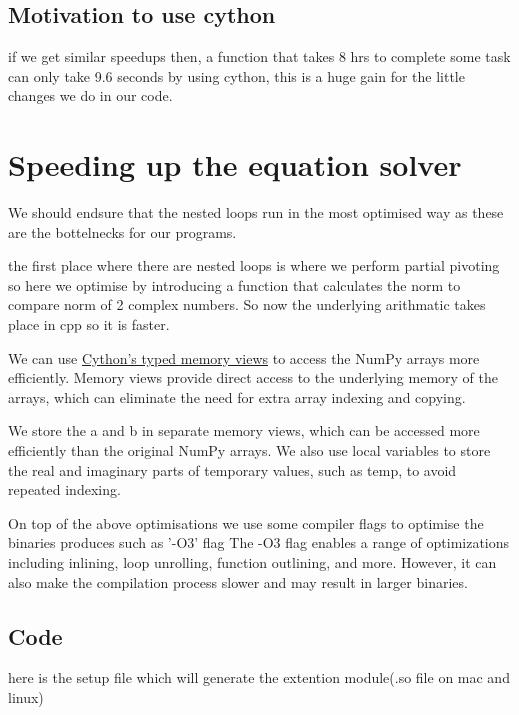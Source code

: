 \documentclass[titlepage, 11pt]{article}
\begin{document}
\subsection{Motivation to use cython}
\begin{flushleft}
    if we get similar speedups then, a function that takes 8 hrs to complete some task can only take
    9.6 seconds by using cython, this is a huge gain for the little changes we do in our code.
\end{flushleft}
\section{Speeding up the equation solver}
We should endsure that the nested loops run in the most optimised
way as these are the bottelnecks for our programs. 
\begin{flushleft}
    the first place where there are nested loops is where we perform partial pivoting
    so here we optimise by introducing a function that calculates
    the norm to compare norm of 2 complex numbers. So now the underlying
    arithmatic takes place in cpp so it is faster.
\end{flushleft}
\begin{flushleft}
    We can use \href{https://cython.readthedocs.io/en/latest/src/userguide/memoryviews.html}{Cython's typed memory views} to access the 
    NumPy arrays more efficiently. Memory views provide direct access to the underlying memory of the arrays, which 
    can eliminate the need for extra array indexing and copying.
\end{flushleft}
\begin{flushleft}
    We store the a and b in separate memory views,
    which can be accessed more efficiently than the original NumPy arrays. We also use local variables to store the real and imaginary parts of temporary values,
    such as temp, to avoid repeated indexing.
\end{flushleft}
\begin{flushleft}
    On top of the above optimisations we use some compiler
    flags to optimise the binaries produces such as '-O3' flag
    The -O3 flag enables a range of optimizations including inlining, loop unrolling, function outlining, and more. 
    However, it can also make the compilation process slower and may result in larger binaries.
\end{flushleft}
\subsection{Code}
here is the setup file which will generate the extention module(.so file on mac and linux)

\end{document}
